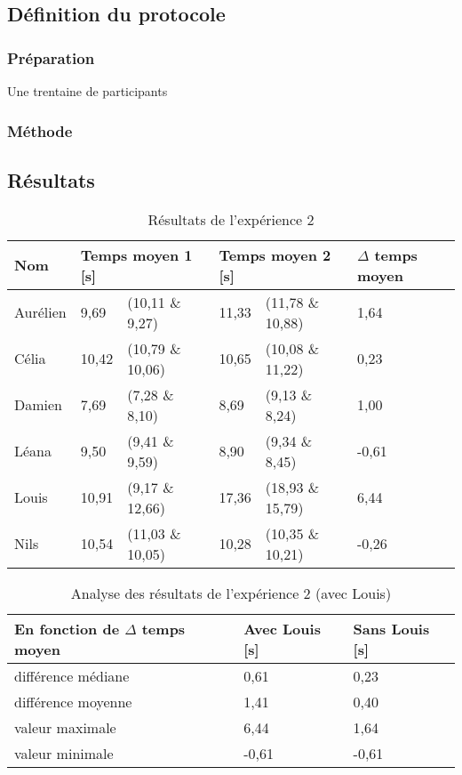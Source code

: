 \documentclass[12pt,fleqn,oneside,openany]{book} %
\begin{document}
\subsection{Définition du protocole} \label{ssec:defProto2.1}

\subsubsection{Préparation} \label{sssec:preparation2.2}
\begin{description}
	\item[Une trentaine de participants]
\end{description}

\subsubsection{Méthode} \label{sssec:methode2.2}

\subsection{Résultats} \label{ssec:resultats2.2}

\begin{table}[h]
	\centering
	\caption{Résultats de l'expérience 2} \label{tbl:exp2.1}
	\begin{tabular}{llllll}
		\toprule
		\textbf{Nom} &  \multicolumn{2}{l}{\textbf{Temps moyen 1 [s]}}  & \multicolumn{2}{l}{\textbf{Temps moyen 2 [s]}} & \textbf{$\Delta$ temps moyen} \\ \midrule
		Aurélien & 9,69 & (10,11 \& 9,27) & 11,33 & (11,78 \& 10,88) & 1,64 \\
		Célia & 10,42 & (10,79 \& 10,06) & 10,65 & (10,08 \& 11,22) & 0,23 \\
		Damien & 7,69 & (7,28 \& 8,10) & 8,69 & (9,13 \& 8,24) & 1,00 \\
		Léana & 9,50 & (9,41 \& 9,59) & 8,90 & (9,34 \& 8,45) & -0,61 \\
		Louis & 10,91 & (9,17 \& 12,66) & 17,36 & (18,93 \& 15,79) & 6,44 \\
		Nils & 10,54 & (11,03 \& 10,05) & 10,28 & (10,35 \& 10,21) & -0,26 \\ \bottomrule
	\end{tabular}
\end{table}

\begin{table}[h]
	\centering
	\caption{Analyse des résultats de l'expérience 2 (avec Louis)} \label{tbl:analyse2.1}
	\begin{tabular}{lll}
		\toprule 
		\textbf{En fonction de $\Delta$ temps moyen} & \textbf{Avec Louis [s]} & \textbf{Sans Louis [s]} \\ \midrule
		différence médiane & 0,61 & 0,23 \\
		différence moyenne & 1,41 & 0,40 \\
		valeur maximale & 6,44 & 1,64 \\
		valeur minimale & -0,61 & -0,61 \\ \bottomrule
	\end{tabular}
\end{table}
\end{document}
